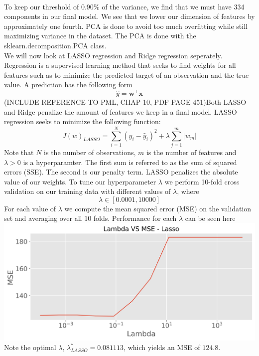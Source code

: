 \documentclass[12pt,a4paper]{article}
\begin{document}
\\
To keep our threshold of 0.90\% of the variance, we find that we must have 334 components in our final model. We see that we lower our dimension of features by approximately one fourth. PCA is done to avoid too much overfitting while still maximizing variance in the dataset. The PCA is done with the sklearn.decomposition.PCA class.\\
We will now look at LASSO regression and Ridge regression seperately. Regression is a supervised learning method that seeks to find weights for all features such as to minimize the predicted target of an observation and the true value. A prediction has the following form
$$\hat{y} = \boldsymbol{w}^\intercal \boldsymbol{x}$$
(INCLUDE REFERENCE TO PML, CHAP 10, PDF PAGE 451)Both LASSO and Ridge penalize the amount of features we keep in a final model. LASSO regression seeks to minimize the following function:
$$J(w)_{LASSO} = \sum_{i = 1}^{N}(y_i - \hat{y}_i)^2 + \lambda \sum_{j=1}^{m}|w_m|$$
Note that $N$ is the number of observations, $m$ is the number of features and $\lambda >0$ is a hyperparamter. The first sum is referred to as the sum of squared errors (SSE). The second is our penalty term. LASSO penalizes the absolute value of our weights. To tune our hyperparameter $\lambda$ we perform 10-fold cross validation on our training data with different values of $\lambda$, where
$$\lambda \in [0.0001, 10000]$$ 
For each value of $\lambda$ we compute the mean squared error (MSE) on the validation set and averaging over all 10 folds. Performance for each $\lambda$ can be seen here\\
\includegraphics[scale = 0.7]{Lasso_MSE.png}
\\
Note the optimal $\lambda$, $\lambda^*_{LASSO} = 0.081113$, which yields an MSE of $124.8$. \\
\end{document}
